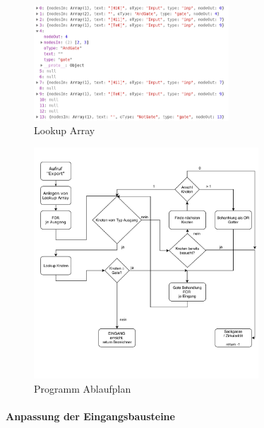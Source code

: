  \begin{figure}[H]
 	\begin{center}
 		\includegraphics[width=0.65\textwidth ,clip]{./images/circuitverseLookup.png}
 		\caption{Lookup Array}
 		\label{img:circuitVerseLookup}
 	\end{center} 
 \end{figure}	
 
   \begin{figure}[H]
 	\begin{center}
 		\includegraphics[width=0.75\textwidth ,clip]{./images/PAP7.pdf}
 		\caption{Programm Ablaufplan}
 		\label{img:circuitVersePAP}
 	\end{center} 
 \end{figure}
 
 \paragraph {Anpassung der Eingangsbausteine}
 
